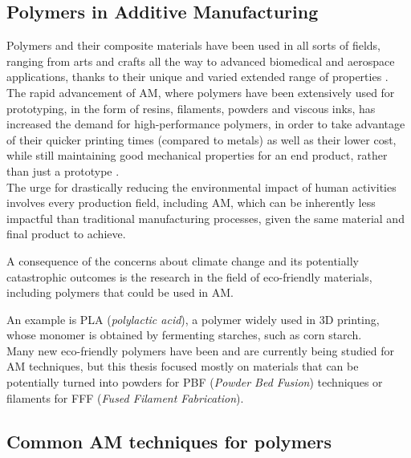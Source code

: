 \documentclass{article}
\begin{document}
    \subsection{Polymers in Additive Manufacturing\label{Polymers_in_AM}}

    Polymers and their composite materials have been used in all sorts of fields, ranging from arts and crafts all the way to advanced biomedical and aerospace applications, thanks 
    to their unique and varied extended range of properties \autocites{Latvian_additive,Materials_add_man_718,Messori_Bondioli_PHAs,doi:10.1063/1.4918516,SLS_3dprinting_biomedical_polymers,Kovalcik_PHA_Review,Recent_progress_polymers_AM}. \\  
    
    The rapid advancement of AM, where polymers have been extensively used for prototyping, in the form of resins, filaments, powders and viscous inks, 
    has increased the demand for high-performance polymers, in order to take advantage of their quicker printing times (compared to metals) as well as their lower cost, while still
    maintaining good mechanical properties for an end product, rather than just a prototype \autocite*{Recent_progress_polymers_AM}. \\ 

    The urge for drastically reducing the environmental impact of human activities involves every production field, including AM, which can be inherently less impactful
    than traditional manufacturing processes, given the same material and final product to achieve. 

    A consequence of the concerns about climate change and its potentially catastrophic outcomes is the research in the field of eco-friendly materials, including polymers 
    that could be used in AM. 
    
    An example is PLA (\textit{polylactic acid}), a polymer widely used in 3D printing, whose monomer is obtained by fermenting starches, such as corn starch. \\ 

    Many new eco-friendly polymers have been and are currently being studied for AM techniques, but this thesis focused mostly on materials that can be potentially turned 
    into powders for PBF (\textit{Powder Bed Fusion}) techniques or filaments for FFF (\textit{Fused Filament Fabrication}). 
    
    \subsection{Common AM techniques for polymers\label{AM_techniques_summary}}
    
\end{document}
